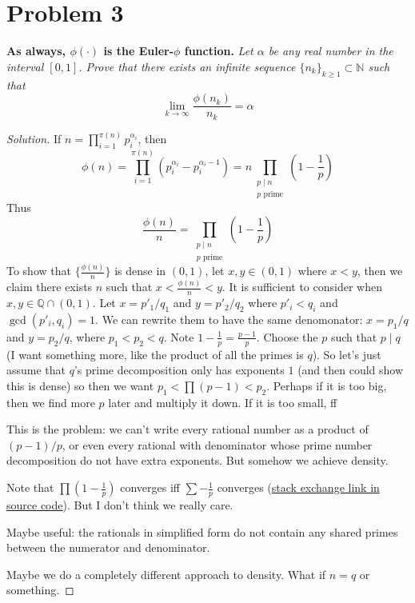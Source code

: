 \documentclass{article}
\newcommand{\N}{{\mathbb N}}
\newcommand{\Q}{{\mathbb Q}}
\begin{document}
\section{Problem 3}
\textbf{As always, $\phi(\cdot)$ is the Euler-$\phi$ function.}\newline
{\it Let $\alpha$ be any real number in the interval $[0,1]$.
Prove that there exists an infinite sequence $\{n_k\}_{k \geq 1} \subset \N$ such that
\[
	\lim_{k\to\infty} \frac{\phi(n_k)}{n_k} = \alpha
\]
}
\begin{proof}[Solution]\let\qed\relax
If $n = \prod_{i=1}^{\pi(n)} p_i^{\alpha_i}$, then
\[
	\phi(n) = \prod_{i=1}^{\pi(n)}(p_i^{\alpha_i} - p_i^{\alpha_i - 1})
	= n \prod_{\substack{p\mid n \\ p \text{ prime}}}\left(1 - \frac{1}{p}\right)
\]
Thus
\[
	\frac{\phi(n)}{n} = \prod_{\substack{p\mid n \\ p \text{ prime}}}\left(1 - \frac{1}{p}\right)
\]
To show that $\{\frac{\phi(n)}{n}\}$ is dense in $(0,1)$,
let $x,y \in (0,1)$ where $x < y$,
then we claim there exists $n$ such that $x < \frac{\phi(n)}{n} < y$.
It is sufficient to consider when $x,y \in \Q \cap (0,1)$.
Let $x = p'_1/q_1$ and $y = p'_2/q_2$ where $p'_i < q_i$ and $\gcd(p'_i,q_i) = 1$.
We can rewrite them to have the same denomonator:
$x = p_1/q$ and $y = p_2/q$, where $p_1 < p_2 < q$.
Note $1 - \frac{1}{p} = \frac{p-1}{p}$.
Choose the $p$ such that $p \mid q$
(I want something more, like the product of all the primes is $q$).
So let's just assume that $q$'s prime decomposition
only has exponents $1$ (and then could show this is dense)
so then we want $p_1 < \prod(p-1) < p_2$.
Perhaps if it is too big, then we find more $p$ later and multiply it down.
If it is too small, ff

This is the problem: we can't write every rational number
as a product of $(p-1)/p$,
or even every rational with denominator whose prime number decomposition
do not have extra exponents.
But somehow we achieve density.

Note that $\prod(1-\frac{1}{p})$ converges iff $\sum -\frac{1}{p}$ converges
(\href{https://math.stackexchange.com/questions/2966559/convergence-of-infinite-product-prod1a-n-where-a-n-changes-sign}{stack exchange link in source code}).
But I don't think we really care.

Maybe useful: the rationals in simplified form do not
contain any shared primes between the numerator and denominator.

Maybe we do a completely different approach to density.
What if $n = q$ or something.
\end{proof}
\end{document}
